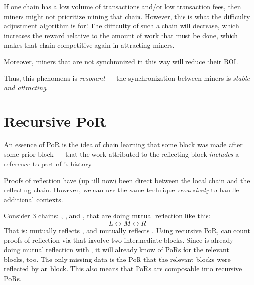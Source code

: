 \documentclass[a4paper,]{article}
\begin{document}
If one chain has a low volume of transactions and/or low transaction fees, then miners might not prioritize mining that chain.
However, this is what the difficulty adjustment algorithm is for!
The difficulty of such a chain will decrease, which increases the reward relative to the amount of work that must be done, which makes that chain competitive again in attracting miners.

Moreover, miners that are not synchronized in this way will reduce their ROI.

Thus, this phenomena is \emph{resonant} --- the synchronization between miners is \emph{stable and attracting}.



\section{Recursive PoR}




An essence of PoR is the idea of chain \cL learning that some \cR block was made after some prior \cL block --- that the work attributed to the reflecting \cR block \emph{includes} a reference to part of \cL's history.

Proofs of reflection have (up till now) been direct between the local chain and the reflecting chain.
However, we can use the same technique \emph{recursively} to handle additional contexts.

Consider 3 chains: \cL, \cM, and \cR, that are doing mutual reflection like this:
\begin{equation}
  L \leftrightarrow M \leftrightarrow R
\end{equation}
That is: \cL mutually reflects \cM, and \cM mutually reflects \cR.
Using recursive PoR, \cL can count proofs of reflection via \cR that involve two intermediate \cM blocks.
Since \cL is already doing mutual reflection with \cM, it will already know of PoRs for the relevant \cM blocks, too.
The only missing data is the PoR that the relevant \cM blocks were reflected by an \cR block.
This also means that PoRs are composable into recursive PoRs.
\end{document}
